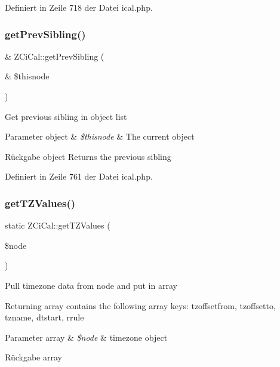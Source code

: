 Definiert in Zeile 718 der Datei ical.\+php.

\mbox{\label{class_z_ci_cal_a14d0d0b4ce2320b9fff1ecc5a6311867}} 
\subsubsection{\texorpdfstring{get\+Prev\+Sibling()}{getPrevSibling()}}
{\footnotesize\ttfamily \& Z\+Ci\+Cal\+::get\+Prev\+Sibling (\begin{DoxyParamCaption}\item[{\&}]{\$thisnode }\end{DoxyParamCaption})}

Get previous sibling in object list


\begin{DoxyParams}[1]{Parameter}
object & {\em \$thisnode} & The current object\\
\hline
\end{DoxyParams}
\begin{DoxyReturn}{Rückgabe}
object Returns the previous sibling 
\end{DoxyReturn}


Definiert in Zeile 761 der Datei ical.\+php.

\mbox{\label{class_z_ci_cal_a4d7326050f7f906a9c608176f6894904}} 
\subsubsection{\texorpdfstring{get\+T\+Z\+Values()}{getTZValues()}}
{\footnotesize\ttfamily static Z\+Ci\+Cal\+::get\+T\+Z\+Values (\begin{DoxyParamCaption}\item[{}]{\$node }\end{DoxyParamCaption})\hspace{0.3cm}{\ttfamily [static]}}

Pull timezone data from node and put in array

Returning array contains the following array keys\+: tzoffsetfrom, tzoffsetto, tzname, dtstart, rrule


\begin{DoxyParams}[1]{Parameter}
array & {\em \$node} & timezone object\\
\hline
\end{DoxyParams}
\begin{DoxyReturn}{Rückgabe}
array 
\end{DoxyReturn}


